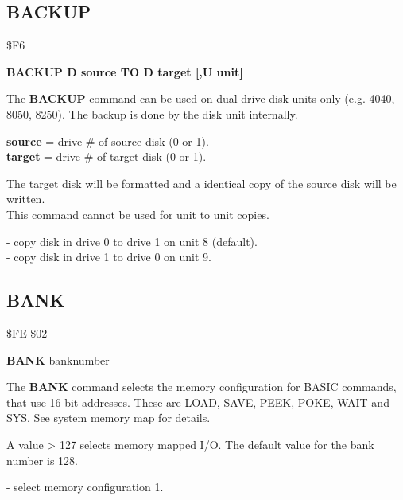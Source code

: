 \newpage
\subsection{BACKUP}
\begin{description}[leftmargin=3cm,style=nextline]
\item [Token:] \$F6
\item [Format:] {\bf BACKUP D source TO D target [,U unit]}
\item [Usage:] The {\bf BACKUP} command can be used on dual drive
   disk units only (e.g. 4040, 8050, 8250).
   The backup is done by the disk unit internally.

   {\bf source} = drive \# of source disk (0 or 1). \\
   {\bf target} = drive \# of target disk (0 or 1).

\item [Remarks:]  The target disk will be formatted and
                 a identical copy of the source disk will be written. \\
                 This command cannot be used for unit to unit copies.

\item [Example:]  - copy disk in drive 0 to
                   drive 1 on unit 8 (default).\\
                  - copy disk in drive 1 to
                   drive 0 on unit 9.
\end{description}


\newpage
\subsection{BANK}
\begin{description}[leftmargin=3cm,style=nextline]
\item [Token:] \$FE \$02
\item [Format:] {\bf BANK} banknumber
\item [Usage:] The {\bf BANK} command selects the memory configuration
               for BASIC commands, that use 16 bit addresses.
               These are LOAD, SAVE, PEEK, POKE, WAIT and SYS.
               See system memory map for details.
\item [Remarks:] A value > 127 selects memory mapped I/O.
                 The default value for the bank number is 128.
\item [Example:]  - select memory configuration 1.
\end{description}

